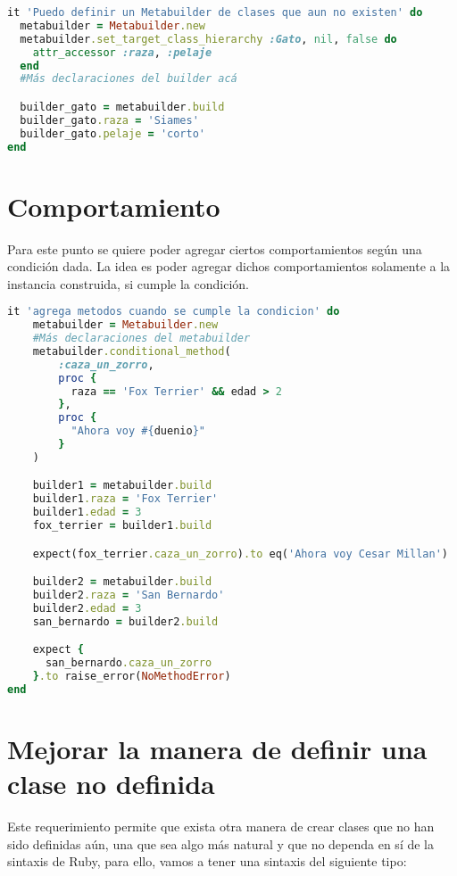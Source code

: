 \documentclass[spanish,a4paper]{article}
\begin{document}
  \begin{lstlisting}[language=Ruby]
it 'Puedo definir un Metabuilder de clases que aun no existen' do
  metabuilder = Metabuilder.new
  metabuilder.set_target_class_hierarchy :Gato, nil, false do
    attr_accessor :raza, :pelaje
  end
  #Más declaraciones del builder acá

  builder_gato = metabuilder.build
  builder_gato.raza = 'Siames'
  builder_gato.pelaje = 'corto'
end
  \end{lstlisting}

\section{Comportamiento}

Para este punto se quiere poder agregar ciertos comportamientos según una condición dada.
La idea es poder agregar dichos comportamientos solamente a la instancia construida, si cumple la condición.

  \begin{lstlisting}[language=Ruby]
it 'agrega metodos cuando se cumple la condicion' do
    metabuilder = Metabuilder.new
    #Más declaraciones del metabuilder
    metabuilder.conditional_method(
        :caza_un_zorro,
        proc {
          raza == 'Fox Terrier' && edad > 2
        },
        proc {
          "Ahora voy #{duenio}"
        }
    )

    builder1 = metabuilder.build
    builder1.raza = 'Fox Terrier'
    builder1.edad = 3
    fox_terrier = builder1.build

    expect(fox_terrier.caza_un_zorro).to eq('Ahora voy Cesar Millan')

    builder2 = metabuilder.build
    builder2.raza = 'San Bernardo'
    builder2.edad = 3
    san_bernardo = builder2.build

    expect {
      san_bernardo.caza_un_zorro
    }.to raise_error(NoMethodError)
end
  \end{lstlisting}

\section{Mejorar la manera de definir una clase no definida}

Este requerimiento permite que exista otra manera de crear clases que no han sido definidas aún, una que sea algo más natural y que no dependa en sí
de la sintaxis de Ruby, para ello, vamos a tener una sintaxis del siguiente tipo:
\end{document}
